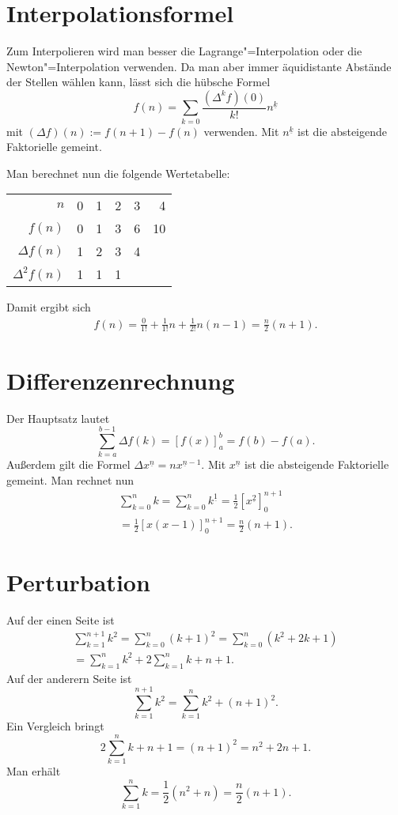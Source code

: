 \documentclass[a4paper,10pt,fleqn,twocolumn,twoside]{scrartcl}
\begin{document}
\section{Interpolationsformel}

Zum Interpolieren wird man besser die Lagrange"=Interpolation oder
die Newton"=Interpolation verwenden. Da man aber immer äquidistante
Abstände der Stellen wählen kann, lässt sich die hübsche Formel%
\[f(n) = \sum_{k=0} \frac{(\Delta^k f)(0)}{k!}n^{\underline k}\]
mit $(\Delta f)(n):=f(n+1)-f(n)$ verwenden.
Mit $n^{\underline k}$ ist die absteigende Faktorielle gemeint.

Man berechnet nun die folgende Wertetabelle:
\begin{table}[h!]
\qquad\begin{tabular}{@{\;}rrrrrr@{\;}}
\toprule
$n$    & 0 & 1 & 2 & 3 & 4\\
$f(n)$ & 0 & 1 & 3 & 6 & 10\\
$\Delta f(n)$ & 1 & 2 & 3 & 4\\
$\Delta^2 f(n)$ & 1 & 1 & 1\\
\bottomrule
\end{tabular}
\end{table}

\noindent
Damit ergibt sich
\begin{gather*}
f(n) = \frac{0}{1!} + \frac{1}{1!}n + \frac{1}{2!}n(n-1)
= \frac{n}{2}(n+1).
\end{gather*}

\section{Differenzenrechnung}

Der Hauptsatz lautet
\[\sum_{k=a}^{b-1} \Delta f(k) = [f(x)]_a^b = f(b)-f(a).\]
Außerdem gilt die Formel $\Delta x^{\underline n} = nx^{\underline n-1}$.
Mit $x^{\underline n}$ ist die absteigende Faktorielle gemeint.
Man rechnet nun%
\begin{gather*}\sum_{k=0}^{n} k = \sum_{k=0}^{n} k^{\underline 1}
= \frac{1}{2}[x^{\underline{2}}]_0^{n+1}\\
= \frac{1}{2}[x(x-1)]_0^{n+1}
= \frac{n}{2}(n+1).
\end{gather*}

\section{Perturbation}

Auf der einen Seite ist
\begin{gather*}
\sum_{k=1}^{n+1} k^2 = \sum_{k=0}^n (k+1)^2
= \sum_{k=0}^n (k^2+2k+1)\\
= \sum_{k=1}^n k^2 + 2\sum_{k=1}^n k + n+1.
\end{gather*}
Auf der anderern Seite ist
\[\sum_{k=1}^{n+1} k^2 = \sum_{k=1}^n k^2 + (n+1)^2.\]
Ein Vergleich bringt
\[2\sum_{k=1}^n k +n+1 = (n+1)^2 = n^2+2n+1.\]
Man erhält
\[\sum_{k=1}^n k = \frac{1}{2}(n^2+n) = \frac{n}{2}(n+1).\]
\end{document}
